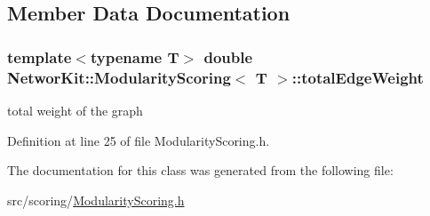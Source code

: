 \subsection{Member Data Documentation}
\hypertarget{class_networ_kit_1_1_modularity_scoring_ae5c47d760a0d0a78349ddc7ed14786a2}{
\subsubsection[{total\-Edge\-Weight}]{\setlength{\rightskip}{0pt plus 5cm}template$<$typename T$>$ double {\bf Networ\-Kit\-::\-Modularity\-Scoring}$<$ T $>$\-::total\-Edge\-Weight\hspace{0.3cm}{\ttfamily [protected]}}}\label{class_networ_kit_1_1_modularity_scoring_ae5c47d760a0d0a78349ddc7ed14786a2}


total weight of the graph 



Definition at line 25 of file Modularity\-Scoring.\-h.



The documentation for this class was generated from the following file\-:\begin{DoxyCompactItemize}
\item 
src/scoring/\hyperlink{_modularity_scoring_8h}{Modularity\-Scoring.\-h}\end{DoxyCompactItemize}
